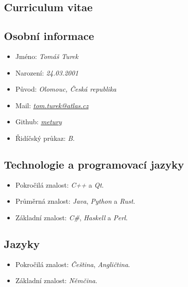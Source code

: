\documentclass{article}
\begin{document}
\begin{center}
	\section*{{\huge Curriculum vitae}}
\end{center}

\hfill

\begin{minipage}[c]{.45\textwidth}
	\subsection*{Osobní informace}
	\begin{itemize}
		\item Jméno: \textit{Tomáš Turek}
		\item Narození: \textit{24.03.2001}
		\item Původ: \textit{Olomouc, Česká republika}
		\item Mail: \href{mailto:tom.turek@atlas.cz}{\textit{tom.turek@atlas.cz}}
		\item Github: \href{https://github.com/metury}{\textit{metury}}
		\item Řidíčský průkaz: \textit{B}.
	\end{itemize}
\end{minipage}
\hfill
\begin{minipage}[c]{.5\textwidth}
	\subsection*{Technologie a programovací jazyky}
	\begin{itemize}
		\item Pokročilá znalost: \textit{C++} a \textit{Qt}.
		\item Průměrná znalost: \textit{Java}, \textit{Python} a \textit{Rust}.
		\item Základní znalost: \textit{C\#}, \textit{Haskell} a \textit{Perl}.
	\end{itemize}
	
	\subsection*{Jazyky}
	\begin{itemize}
		\item Pokročilá znalost: \textit{Čeština}, \textit{Angličtina}.
		\item Základní znalost: \textit{Němčina}.
	\end{itemize}
\end{minipage}
\end{document}
